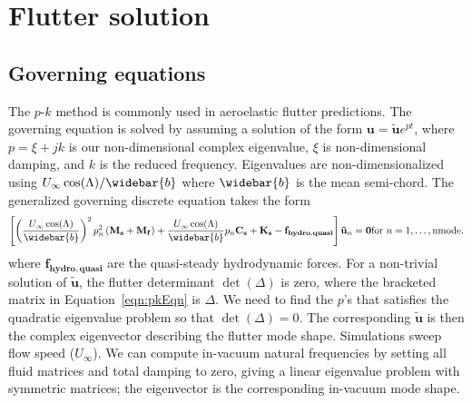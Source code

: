 \documentclass[10pt]{article}
\newcommand{\mbf}[1]{\mathbf{#1}}
\newcommand{\Uinf}{U_{\infty}}
\newcommand{\tn}[1]{\textrm{#1}}
\begin{document}
\clearpage
\section{Flutter solution}
\subsection{Governing equations}
% 
The $p$-$k$ method is commonly used in aeroelastic flutter predictions.
The governing equation is solved by assuming a solution of the form
$    \mbf{u} = \tilde{\mbf{u}}e^{pt}$,
%
where $p=\xi + j k$ is our non-dimensional complex eigenvalue, $\xi$ is non-dimensional damping, and $k$ is the reduced frequency.
Eigenvalues are non-dimensionalized using $\Uinf \cos(\Lambda)/\widebar{b}$ where $\widebar{b}$ is the mean semi-chord.
The generalized governing discrete equation takes the form
\begin{multline}
	\label{eqn:pkEqn}
	\left[
		\left( \frac{\Uinf\cos(\Lambda)}{\widebar{b}} \right)^2
		p_n^2\left(   \mbf{M_s}   + \mbf{M_f}\right)
		+ \frac{\Uinf\cos(\Lambda)}{\widebar{b}}
		p_n\mbf{C_s}
		+ \mbf{K_s}
		- \mbf{f_{hydro,quasi}}
		\right]
	\mbf{\tilde{u}}_n = \mbf{0}
	\hfill
	\tn{for }n = 1,\ldots,\tn{nmode}.
\end{multline}
where $\mbf{f_{hydro,quasi}}$ are the quasi-steady hydrodynamic forces.
For a non-trivial solution of $\mbf{\tilde{u}}$, the flutter determinant $\det(\Delta)$ is zero, where the bracketed matrix in Equation~\eqref{eqn:pkEqn} is $\Delta$.
We need to find the $p$'s that satisfies the quadratic eigenvalue problem so that $\det(\Delta) = 0$.
The corresponding $\mbf{\tilde{u}}$ is then the complex eigenvector describing the flutter mode shape.
Simulations sweep flow speed ($\Uinf$).
We can compute in-vacuum natural frequencies by setting all fluid matrices and total damping to zero, giving a linear eigenvalue problem with symmetric matrices;
the eigenvector is the corresponding in-vacuum mode shape.
\end{document}
